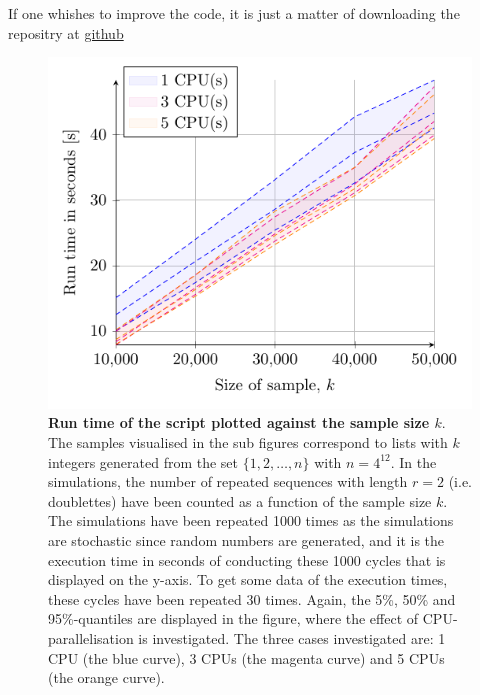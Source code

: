 \documentclass{article}
\begin{document}
If one whishes to improve the code, it is just a matter of downloading the repositry at \url{github}

\begin{figure}[htbp!]
  \begin{center}
\includegraphics[width=\textwidth]{../Figures/Fig2/Fig2.pdf}
\caption[\textbf{Run time of the script plotted against the sample size $k$}]{\textbf{Run time of the script plotted against the sample size $k$}. The samples visualised in the sub figures correspond to lists with $k$ integers generated from the set $\{1,2,\ldots,n\}$ with $n=4^{12}$. In the simulations, the number of repeated sequences with length $r=2$ (i.e. doublettes) have been counted as a function of the sample size $k$. The simulations have been repeated 1000 times as the simulations are stochastic since random numbers are generated, and it is the execution time in seconds of conducting these 1000 cycles that is displayed on the y-axis. To get some data of the execution times, these cycles have been repeated 30 times. Again, the 5\%, 50\% and 95\%-quantiles are displayed in the figure, where the effect of CPU-parallelisation is investigated. The three cases investigated are: 1 CPU (the blue curve), 3 CPUs (the magenta curve) and 5 CPUs (the orange curve). }
\label{fig:HPC}
  \end{center}
  \end{figure}


\clearpage


\end{document}
